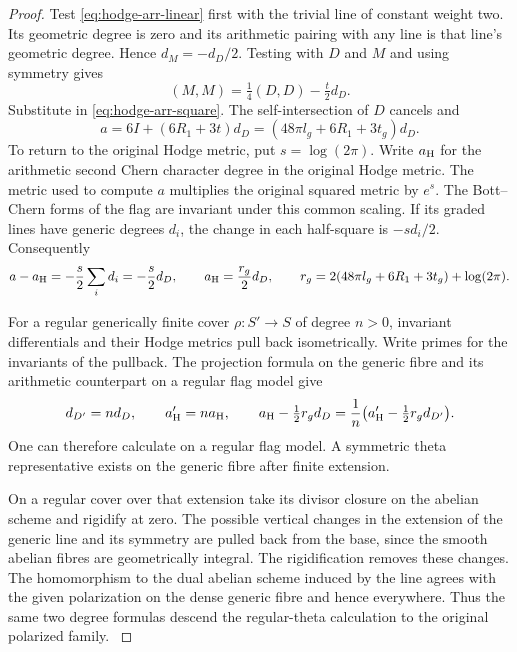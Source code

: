 \begin{proof}
Test \eqref{eq:hodge-arr-linear} first with the trivial line
of constant weight two. Its geometric degree is zero and its
arithmetic pairing with any line is that line's geometric
degree. Hence \(d_M=-d_D/2\). Testing with \(D\) and \(M\)
and using symmetry gives
\[
       (M,M)=\tfrac14(D,D)-\tfrac t2 d_D .
\]
Substitute in \eqref{eq:hodge-arr-square}. The self-intersection
of \(D\) cancels and
\[
       a=6I+(6R_1+3t)d_D
        =(48\pi l_g+6R_1+3t_g)d_D .
\]
To return to the original Hodge metric, put \(s=\log(2\pi)\).
Write \(a_{\rm H}\) for the arithmetic second Chern character degree
in the original Hodge metric. The metric used to compute \(a\)
multiplies the original squared metric by \(e^s\). The
Bott--Chern forms of the flag are invariant under this common
scaling. If its graded lines have generic degrees \(d_i\), the
change in each half-square is \(-s d_i/2\). Consequently
\begin{equation}\label{eq:hodge-change-of-metric}
 a-a_{\rm H}=-\frac{s}{2}\sum_i d_i=-\frac{s}{2}d_D,
 \qquad a_{\rm H}=\frac{r_g}{2}d_D,\qquad
 r_g=2(48\pi l_g+6R_1+3t_g)+\log(2\pi).
\end{equation}
\label{cor:hodge-surface-degree-5}

For a regular generically finite cover \(\rho:S'\to S\) of
degree \(n>0\), invariant differentials and their Hodge metrics
pull back isometrically. Write primes for the invariants of the pullback.
The projection formula on the generic fibre and its arithmetic
counterpart on a regular flag model give
\[
 d_{D'}=n d_D,\qquad a'_{\rm H}=n a_{\rm H},\qquad
 a_{\rm H}-\tfrac12 r_gd_D
       =\frac{1}{n}\bigl(a'_{\rm H}-\tfrac12 r_gd_{D'}\bigr).
\]
One can
therefore calculate on a regular flag model. A symmetric
theta representative exists on the generic fibre after finite
extension.

On a regular cover over that extension take its
divisor closure on the abelian scheme and rigidify at zero.
The possible vertical changes in the extension of the generic
line and its symmetry are pulled back from the base, since
the smooth abelian fibres are geometrically integral. The
rigidification removes these changes. The homomorphism to the
dual abelian scheme induced by the line agrees with the given
polarization on the dense generic fibre and hence everywhere.
Thus the same two degree formulas descend the regular-theta
calculation to the original polarized family.
\label{cor:hodge-surface-degree-6}


\end{proof}
